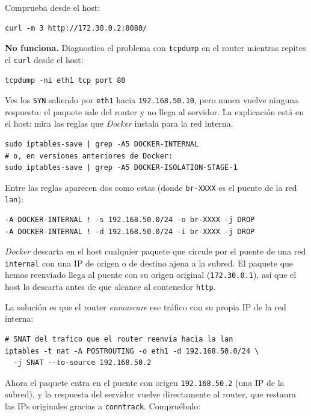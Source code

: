 \documentclass[a4paper]{article}
\begin{document}
Comprueba desde el host:

\begin{verbatim}
curl -m 3 http://172.30.0.2:8080/
\end{verbatim}

\textbf{No funciona.} Diagnostica el problema con \texttt{tcpdump} en el router mientras repites el \texttt{curl} desde el host:

\begin{verbatim}
tcpdump -ni eth1 tcp port 80
\end{verbatim}

Ves los \texttt{SYN} saliendo por \texttt{eth1} hacia \texttt{192.168.50.10}, pero nunca vuelve ninguna respuesta: el paquete sale del router y no llega al servidor. La explicación está en el host: mira las reglas que \emph{Docker} instala para la red interna.

\begin{verbatim}
sudo iptables-save | grep -A5 DOCKER-INTERNAL
# o, en versiones anteriores de Docker:
sudo iptables-save | grep -A5 DOCKER-ISOLATION-STAGE-1
\end{verbatim}

Entre las reglas aparecen dos como estas (donde \texttt{br-XXXX} es el puente de la red \texttt{lan}):

\begin{verbatim}
-A DOCKER-INTERNAL ! -s 192.168.50.0/24 -o br-XXXX -j DROP
-A DOCKER-INTERNAL ! -d 192.168.50.0/24 -i br-XXXX -j DROP
\end{verbatim}

\emph{Docker} descarta en el host cualquier paquete que circule por el puente de una red \texttt{internal} con una IP de origen o de destino ajena a la subred. El paquete que hemos reenviado llega al puente con su origen original (\texttt{172.30.0.1}), así que el host lo descarta antes de que alcance al contenedor \texttt{http}.

La solución es que el router \emph{enmascare} ese tráfico con su propia IP de la red interna:

\begin{verbatim}
# SNAT del trafico que el router reenvia hacia la lan
iptables -t nat -A POSTROUTING -o eth1 -d 192.168.50.0/24 \
  -j SNAT --to-source 192.168.50.2
\end{verbatim}

Ahora el paquete entra en el puente con origen \texttt{192.168.50.2} (una IP de la subred), y la respuesta del servidor vuelve directamente al router, que restaura las IPs originales gracias a \texttt{conntrack}. Compruébalo:
\end{document}
